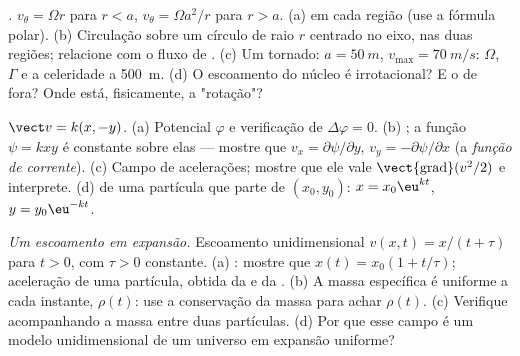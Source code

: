 \begin{exercise}[$\star\star$]\label{exo:b2:fluid-kinematics:8}
\emph{.} $v_\theta = \Omega r$ para $r < a$, $v_\theta = \Omega a^2/r$
para $r > a$. (a)  em cada região (use a fórmula polar). (b)
Circulação sobre um círculo de raio $r$ centrado no eixo, nas duas
regiões; relacione com o fluxo de . (c) Um tornado: $a = \qty{50}{m}$,
$v_{\max} = \qty{70}{m/s}$: $\Omega$, $\Gamma$ e a celeridade a \qty{500}{m}.
(d) O escoamento do núcleo é irrotacional? E o de fora? Onde está,
fisicamente, a "rotação"?
\end{exercise}

\begin{exercise}[$\star\star$]\label{exo:b2:fluid-kinematics:9}
\emph{} $\vect v = k(x, -y)$. (a) Potencial $\varphi$ e
verificação de $\Delta\varphi = 0$. (b) ; a função $\psi = kxy$ é
constante sobre elas --- mostre que $v_x = \partial\psi/\partial y$, $v_y = -\partial\psi/
\partial x$ (a \emph{função de corrente}). (c) Campo de acelerações; mostre que ele
vale $\operatorname{\vect{grad}}(v^2/2)$ e interprete. (d)  de uma
partícula que parte de $(x_0, y_0)$: $x = x_0\eu^{kt}$, $y = y_0\eu^{-kt}$.
\end{exercise}

\begin{exercise}[$\star\star\star$]\label{exo:b2:fluid-kinematics:10}
\emph{Um escoamento em expansão.} Escoamento unidimensional $v(x, t) = x/(t + \tau)$
para $t > 0$, com $\tau > 0$ constante. (a) : mostre que $x(t) = x_0(1 +
t/\tau)$; aceleração de uma partícula, obtida da  e da
. (b) A massa específica é uniforme a cada instante,
$\rho(t)$: use a conservação da massa para achar $\rho(t)$. (c) Verifique
acompanhando a massa entre duas partículas. (d) Por que esse campo é um
modelo unidimensional de um universo em expansão uniforme?
\end{exercise}

